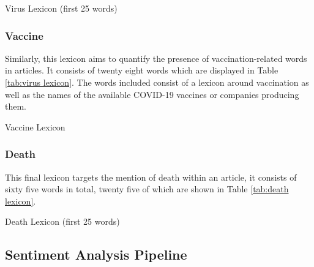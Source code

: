 \begin{table}[htb]
\caption{Virus Lexicon (first 25 words)}
\label{tab:virus lexicon}
\centering
{}
\end{table}

\subsubsection{Vaccine}

Similarly, this lexicon aims to quantify the presence of vaccination-related words in articles. It consists of twenty eight words which are displayed in Table \ref{tab:virus lexicon}. The words included consist of a lexicon around vaccination as well as the names of the available COVID-19 vaccines or companies producing them.

\begin{table}[htb]
\caption{Vaccine Lexicon}
\label{tab:virus lexicon}
\centering
{}
\end{table}

\subsubsection{Death}

This final lexicon targets the mention of death within an article, it consists of sixty five words in total, twenty five of which are shown in Table \ref{tab:death lexicon}.

\begin{table}[htb]
\caption{Death Lexicon (first 25 words)}
\label{tab:death lexicon}
\centering
{}
\end{table}

\subsection{Sentiment Analysis Pipeline}


